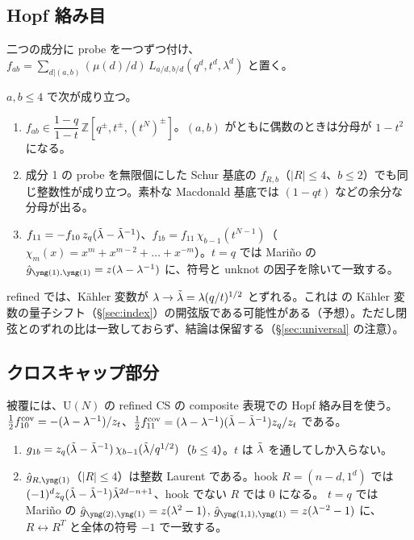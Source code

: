 \subsection{Hopf 絡み目}
二つの成分に probe を一つずつ付け、$f_{ab} = \sum_{d | (a,b)} (\mu(d)/d)\, L_{a/d, b/d}(q^d, t^d, \lambda^d)$ と置く。
\begin{compresult}\label{cr:hopf}
$a, b \le 4$ で次が成り立つ。
\begin{enumerate}
\item $f_{ab} \in \dfrac{1 - q}{1 - t}\,\mathbb{Z}[q^\pm, t^\pm, (t^N)^\pm]$。$(a, b)$ がともに偶数のときは分母が $1 - t^2$ になる。
\item 成分 1 の probe を無限個にした Schur 基底の $f_{R,b}$（$|R| \le 4$、$b \le 2$）でも同じ整数性が成り立つ。素朴な Macdonald 基底では $(1 - qt)$ などの余分な分母が出る。
\item $f_{11} = -f_{10}\, z_q(\tilde\lambda - \tilde\lambda^{-1})$、$f_{1b} = f_{11}\,\chi_{b-1}(t^{N-1})$（$\chi_m(x) = x^m + x^{m-2} + \dots + x^{-m}$）。$t = q$ では Mariño の $\hat g_{\yone,\yone} = z(\lambda - \lambda^{-1})$ に、符号と unknot の因子を除いて一致する。
\end{enumerate}
\end{compresult}
refined では、Kähler 変数が $\lambda \to \tilde\lambda = \lambda (q/t)^{1/2}$ とずれる。これは \cite{AM22} の Kähler 変数の量子シフト（§\ref{sec:index}）の開弦版である可能性がある（予想）。ただし閉弦とのずれの比は一致しておらず、結論は保留する（§\ref{sec:universal} の注意）。

\subsection{クロスキャップ部分}
被覆には、U$(N)$ の refined CS の composite 表現での Hopf 絡み目を使う。$\tfrac12 f^{\mathrm{cov}}_{10} = -(\lambda - \lambda^{-1})/z_t$、$\tfrac12 f^{\mathrm{cov}}_{11} = (\lambda - \lambda^{-1})(\tilde\lambda - \tilde\lambda^{-1})z_q/z_t$ である。
\begin{compresult}\label{cr:hopfg}
\begin{enumerate}
\item $g_{1b} = z_q(\tilde\lambda - \tilde\lambda^{-1})\,\chi_{b-1}(\tilde\lambda/q^{1/2})$（$b \le 4$）。$t$ は $\tilde\lambda$ を通してしか入らない。
\item $\hat g_{R,\yone}$（$|R| \le 4$）は整数 Laurent である。hook $R = (n-d, 1^d)$ では $(-1)^d z_q(\tilde\lambda - \tilde\lambda^{-1})\tilde\lambda^{2d-n+1}$、hook でない $R$ では 0 になる。
$t = q$ では Mariño の $\hat g_{\ytwo,\yone} = z(\lambda^2 - 1)$, $\hat g_{\yoneone,\yone} = z(\lambda^{-2} - 1)$ に、$R \leftrightarrow R^T$ と全体の符号 $-1$ で一致する。
\end{enumerate}
\end{compresult}

